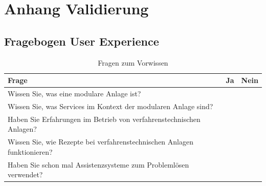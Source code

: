 \chapter{Anhang Validierung}
\section{Fragebogen User Experience}

\begin{table}[htbp]
\caption{Fragen zum Vorwissen}
\centering
\begin{tabular}{|p{}|l|l|}
\hline
Frage & Ja & Nein \\
\hline
Wissen Sie, was eine modulare Anlage ist? & & \\
\hline
Wissen Sie, was Services im Kontext der modularen Anlage sind? & & \\
\hline
Haben Sie Erfahrungen im Betrieb von verfahrenstechnischen Anlagen? & & \\
\hline
Wissen Sie, wie Rezepte bei verfahrenstechnischen Anlagen funktionieren? & & \\
\hline
Haben Sie schon mal Assistenzsysteme zum Problemlösen verwendet? & & \\
\hline 
\end{tabular}
\end{table}

